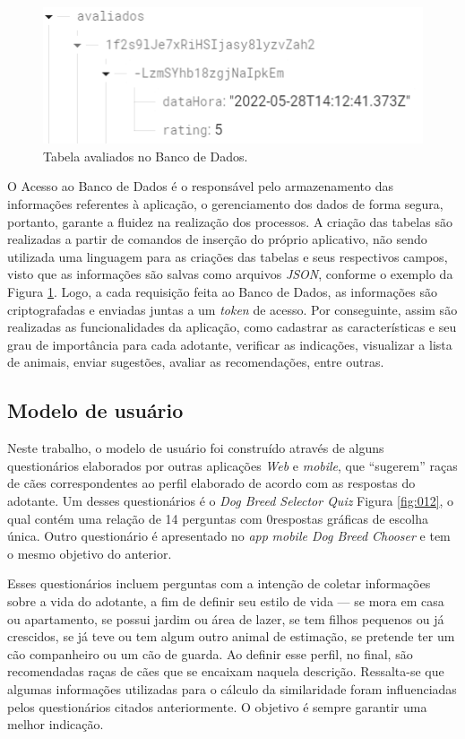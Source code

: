 \documentclass[portuguese]{textolivre}
\begin{document}
\begin{figure}[H]
	\centering
	\includegraphics[scale=1]{imagens/fig-010.png}
	\caption{Tabela avaliados no Banco de Dados.}
	\label{fig:011}
\end{figure}

O Acesso ao Banco de Dados é o responsável pelo armazenamento das informações referentes à aplicação, o gerenciamento dos dados de forma segura, portanto, garante a fluidez na realização dos processos. A criação das tabelas são realizadas a partir de comandos de inserção do próprio aplicativo, não sendo utilizada uma linguagem para as criações das tabelas e seus respectivos campos, visto que as informações são salvas como arquivos \textit{JSON}, conforme o exemplo da Figura \ref{fig:011}. Logo, a cada requisição feita ao Banco de Dados, as informações são criptografadas e enviadas juntas a um \textit{token} de acesso. Por conseguinte, assim são realizadas as funcionalidades da aplicação, como cadastrar as características e seu grau de importância para cada adotante, verificar as indicações, visualizar a lista de animais, enviar sugestões, avaliar as recomendações, entre outras.

\subsection {Modelo de usuário}

Neste trabalho, o modelo de usuário foi construído através de alguns questionários elaborados por outras aplicações \textit{Web} e \textit{mobile}, que “sugerem” raças de cães correspondentes ao perfil elaborado de acordo com as respostas do adotante. Um desses questionários é o \textit{Dog Breed Selector Quiz} Figura \ref{fig:012}, o qual contém uma relação de 14 perguntas com 0respostas gráficas de escolha única. Outro questionário é apresentado no \textit{app} \textit{mobile Dog Breed Chooser} e tem o mesmo objetivo do anterior.

Esses questionários incluem perguntas com a intenção de coletar informações sobre a vida do adotante, a fim de definir seu estilo de vida — se mora em casa ou apartamento, se possui jardim ou área de lazer, se tem filhos pequenos ou já crescidos, se já teve ou tem algum outro animal de estimação, se pretende ter um cão companheiro ou um cão de guarda. Ao definir esse perfil, no final, são recomendadas raças de cães que se encaixam naquela descrição. Ressalta-se que algumas informações utilizadas para o cálculo da similaridade foram influenciadas pelos questionários citados anteriormente. O objetivo é sempre garantir uma melhor indicação. 
\end{document}
